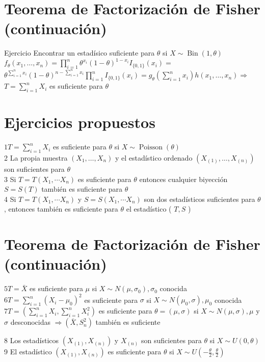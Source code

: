   
  
  \section*{Teorema de Factorización de Fisher (continuación)}
  Ejercicio Encontrar un estadísico suficiente para $\theta$ si $X \sim \operatorname{Bin}(1, \theta)$ $f_{\theta}\left(x_{1}, \ldots, x_{n}\right)=\prod_{i=1}^{n} \theta^{x_{i}}(1-\theta)^{1-x_{i}} I_{\{0,1\}}\left(x_{i}\right)=$ $\theta^{\sum_{i=1}^{n} x_{i}}(1-\theta)^{n-\sum_{i=1}^{n} x_{i}} \prod_{i=1}^{n} I_{\{0,1\}}\left(x_{i}\right)=g_{\theta}\left(\sum_{i=1}^{n} x_{i}\right) h\left(x_{1}, \ldots, x_{n}\right) \Rightarrow$ $T=\sum_{i=1}^{n} X_{i}$ es suficiente para $\theta$
  
  \section*{Ejercicios propuestos}
  $1 T=\sum_{i=1}^{n} X_{i}$ es suficiente para $\theta$ si $X \sim \operatorname{Poisson}(\theta)$\\
  2 La propia muestra $\left(X_{1}, \ldots, X_{n}\right)$ y el estadístico ordenado $\left(X_{(1)}, \ldots, X_{(n)}\right)$ son suficientes para $\theta$\\
  3 Si $T=T\left(X_{1}, \cdots X_{n}\right)$ es suficiente para $\theta$ entonces cualquier biyección $S=S(T)$ también es suficiente para $\theta$\\
  4 Si $T=T\left(X_{1}, \cdots X_{n}\right)$ y $S=S\left(X_{1}, \cdots X_{n}\right)$ son dos estadísticos suficientes para $\theta$, entonces también es suficiente para $\theta$ el estadístico ( $T, S$ )
  
  \section*{Teorema de Factorización de Fisher (continuación)}
  $5 T=\bar{X}$ es suficiente para $\mu$ si $X \sim N\left(\mu, \sigma_{0}\right), \sigma_{0}$ conocida\\
  $6 T=\sum_{i=1}^{n}\left(X_{i}-\mu_{0}\right)^{2}$ es suficiente para $\sigma$ si $X \sim N\left(\mu_{0}, \sigma\right), \mu_{0}$ conocida\\
  $7 T=\left(\sum_{i=1}^{n} X_{i}, \sum_{i=1}^{n} X_{i}^{2}\right)$ es suficiente para $\theta=(\mu, \sigma)$ si $X \sim N(\mu, \sigma), \mu$ y $\sigma$ desconocidas $\Rightarrow\left(\bar{X}, S_{n}^{2}\right)$ también es suficiente
  
  8 Los estadísticos $\left(X_{(1)}, X_{(n)}\right)$ y $X_{(n)}$ son suficientes para $\theta$ si $X \sim U(0, \theta)$\\
  9 El estadístico $\left(X_{(1)}, X_{(n)}\right)$ es suficiente para $\theta$ si $X \sim U\left(-\frac{\theta}{2}, \frac{\theta}{2}\right)$
  
